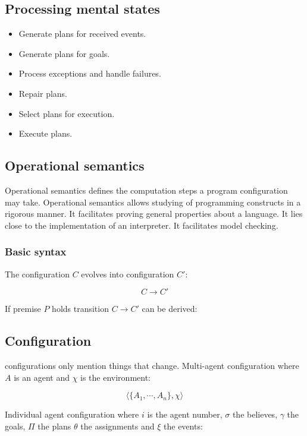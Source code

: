 \documentclass{article}
\begin{document}
\subsection{Processing mental states}

\begin{itemize}
	\item Generate plans for received events.
	\item Generate plans for goals.
	\item Process exceptions and handle failures.
	\item Repair plans.
	\item Select plans for execution.
	\item Execute plans.
\end{itemize}

\subsection{Operational semantics}
Operational semantics defines the computation steps a program
configuration may take. Operational semantics allows studying
of programming constructs in a rigorous manner. It facilitates proving
general properties about a language. It lies close to the implementation
of an interpreter. It facilitates model checking.

\subsubsection{Basic syntax}
The configuration $C$ evolves into configuration $C'$:

\[C \to C'\]

If premise $P$ holds transition $C \to C'$ can be derived:

\begin{prooftree}
\end{prooftree}

\subsection{Configuration}
configurations only mention things that change.
Multi-agent configuration where $A$ is an agent and $\chi$ is the
environment:

\[\langle \{A_1, \cdots, A_n\}, \chi\rangle \]

Individual agent configuration where $i$ is the agent number, $\sigma$ the
believes, $\gamma$ the goals, $\Pi$ the plans $\theta$ the assignments and
$\xi$ the events:
\end{document}
